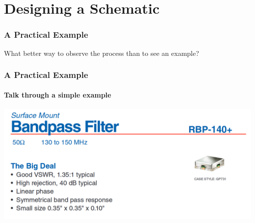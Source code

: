 \documentclass[]{beamer}
\begin{document}
\section[Design]{Designing a Schematic}
\begin{frame}
    \frametitle{A Practical Example}
    {\huge What better way to observe the process than to see an example?}
\end{frame}

\begin{frame}
    \frametitle{A Practical Example}
    \framesubtitle{Talk through a simple example}
    \includegraphics[width=0.75\paperwidth]{images/RBP140Info.png}
\end{frame}
\end{document}
